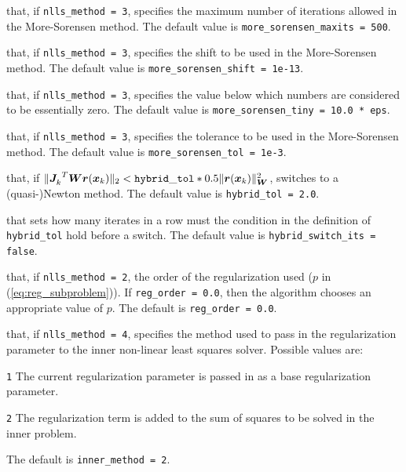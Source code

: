 \begin{description}

that, if {\tt nlls\_method = 3}, specifies the maximum number of iterations allowed in the More-Sorensen method.
The default value is {\tt more\_sorensen\_maxits = 500}.

that, if {\tt nlls\_method = 3}, specifies the shift to be used in the More-Sorensen method.
The default value is {\tt more\_sorensen\_shift = 1e-13}.

that, if {\tt nlls\_method = 3}, specifies the value below which numbers are considered to be essentially zero.
The default value is {\tt more\_sorensen\_tiny = 10.0 * eps}.

that, if {\tt nlls\_method = 3}, specifies the tolerance to be used in the More-Sorensen method.
The default value is {\tt more\_sorensen\_tol = 1e-3}.

that, if \(\|{{\bm J}_{k}^{}}^T {\bm W} {\bm r}({\bm x}_k) \|_2 < \mathtt{hybrid\_tol} * 0.5 \|{\bm r}({\bm x}_k)\|_{\bm W}^2\), switches to a \newline(quasi-)Newton method.
The default value is {\tt hybrid\_tol = 2.0}.

that sets how many iterates in a row must the condition in the definition of {\tt hybrid\_tol} hold before a switch.
The default value is {\tt hybrid\_switch\_its = false}.

that, if {\tt nlls\_method = 2}, the order of the regularization used ($p$ in (\ref{eq:reg_subproblem})).  If {\tt reg\_order = 0.0}, then the algorithm
chooses an appropriate value of $p$. The default is {\tt reg\_order = 0.0}.

that, if {\tt nlls\_method = 4}, specifies the method used to pass in 
the regularization parameter to the inner non-linear least squares solver.  
Possible values are:
\begin{description}
  \item {\tt 1} The current regularization parameter is passed in as a base regularization parameter.
  \item {\tt 2} The regularization term is added to the sum of squares to be solved in the inner problem.
\end{description}
The default is {\tt inner\_method = 2}.


\end{description}


